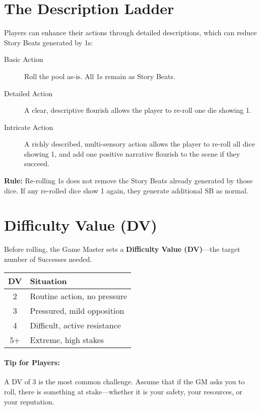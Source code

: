 \section{The Description Ladder} 

Players can enhance their actions through detailed descriptions, which can reduce Story Beats generated by 1s:

\begin{description}
  \item[Basic Action] Roll the pool as-is. All 1s remain as Story Beats.
  \item[Detailed Action] A clear, descriptive flourish allows the player to re-roll one die showing 1.
  \item[Intricate Action] A richly described, multi-sensory action allows the player to re-roll all dice showing 1, and add one positive narrative flourish to the scene if they succeed.
\end{description}

\textbf{Rule:} Re-rolling 1s does not remove the Story Beats already generated by those dice. If any re-rolled dice show 1 again, they generate additional SB as normal.

\section{Difficulty Value (DV)} 

Before rolling, the Game Master sets a \textbf{Difficulty Value (DV)}—the target number of Successes needed.

\begin{center}
\small
\begin{tabular}{cl}
\toprule
\textbf{DV} & \textbf{Situation} \\
\midrule
2 & Routine action, no pressure \\
3 & Pressured, mild opposition \\
4 & Difficult, active resistance \\
5+ & Extreme, high stakes \\
\bottomrule
\end{tabular}
\end{center}

\paragraph{Tip for Players:} A DV of 3 is the most common challenge. Assume that if the GM asks you to roll, there is something at stake—whether it is your safety, your resources, or your reputation.

